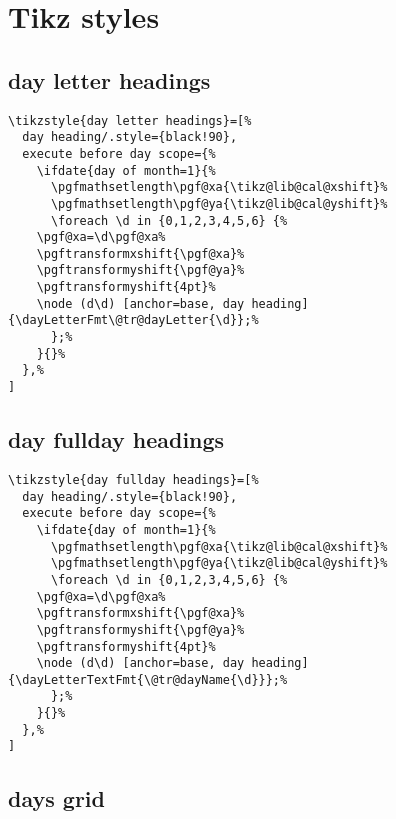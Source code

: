 \documentclass[11pt,oneside]{memoir-article}
\begin{document}
\section{Tikz styles}
\label{sec:org5bdadf2}
\subsection{day letter headings}
\label{sec:orgd8fcce4}

\begin{verbatim}
\tikzstyle{day letter headings}=[%
  day heading/.style={black!90},
  execute before day scope={%
    \ifdate{day of month=1}{%
      \pgfmathsetlength\pgf@xa{\tikz@lib@cal@xshift}%
      \pgfmathsetlength\pgf@ya{\tikz@lib@cal@yshift}%
      \foreach \d in {0,1,2,3,4,5,6} {%
	\pgf@xa=\d\pgf@xa%
	\pgftransformxshift{\pgf@xa}%
	\pgftransformyshift{\pgf@ya}%
	\pgftransformyshift{4pt}%
	\node (d\d) [anchor=base, day heading] {\dayLetterFmt\@tr@dayLetter{\d}};%
      };%
    }{}%
  },%
]
\end{verbatim}

\subsection{day fullday headings}
\label{sec:orgd0d4eb7}

\begin{verbatim}
\tikzstyle{day fullday headings}=[%
  day heading/.style={black!90},
  execute before day scope={%
    \ifdate{day of month=1}{%
      \pgfmathsetlength\pgf@xa{\tikz@lib@cal@xshift}%
      \pgfmathsetlength\pgf@ya{\tikz@lib@cal@yshift}%
      \foreach \d in {0,1,2,3,4,5,6} {%
	\pgf@xa=\d\pgf@xa%
	\pgftransformxshift{\pgf@xa}%
	\pgftransformyshift{\pgf@ya}%
	\pgftransformyshift{4pt}%
	\node (d\d) [anchor=base, day heading] {\dayLetterTextFmt{\@tr@dayName{\d}}};%
      };%
    }{}%
  },%
]
\end{verbatim}

\subsection{days grid}
\label{sec:org23bab34}
\end{document}
